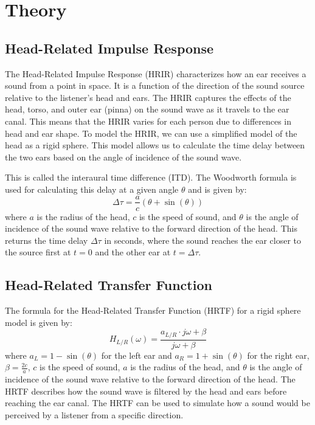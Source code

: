 \chapter{Theory}

\section{Head-Related Impulse Response}
\label{sec:hrir}

The Head-Related Impulse Response (HRIR) characterizes how an ear receives a sound from a point in space. It is a function of the direction of the sound source relative to the listener's head and ears. The HRIR captures the effects of the head, torso, and outer ear (pinna) on the sound wave as it travels to the ear canal. This means that the HRIR varies for each person due to differences in head and ear shape. To model the HRIR, we can use a simplified model of the head as a rigid sphere. This model allows us to calculate the time delay between the two ears based on the angle of incidence of the sound wave. 

This is called the interaural time difference (ITD). The Woodworth formula is used for calculating this delay at a given angle \( \theta \) and is given by:
\begin{equation}
  \Delta\tau = \frac{a}{c} (\theta + \sin(\theta))
  \label{eq:woodworth}
\end{equation}
where \( a \) is the radius of the head, \( c \) is the speed of sound, and \( \theta \) is the angle of incidence of the sound wave relative to the forward direction of the head. This returns the time delay \( \Delta\tau \) in seconds, where the sound reaches the ear closer to the source first at \( t = 0 \) and the other ear at \( t = \Delta\tau \).

\section{Head-Related Transfer Function}
\label{sec:hrtf}

The formula for the Head-Related Transfer Function (HRTF) for a rigid sphere model is given by:
\begin{equation}
  H_{L/R}(\omega) = \frac{a_{L/R} \cdot j\omega + \beta}{j\omega + \beta} 
  \label{eq:hrtf}
\end{equation}
where \( a_{L} = 1 - \sin(\theta) \) for the left ear and \( a_{R} = 1 + \sin(\theta) \) for the right ear, \( \beta = \frac{2c}{a} \), \( c \) is the speed of sound, \( a \) is the radius of the head, and \( \theta \) is the angle of incidence of the sound wave relative to the forward direction of the head. The HRTF describes how the sound wave is filtered by the head and ears before reaching the ear canal. The HRTF can be used to simulate how a sound would be perceived by a listener from a specific direction.


